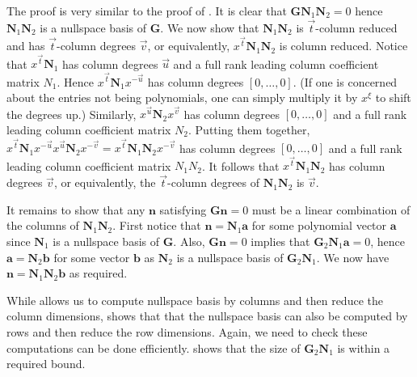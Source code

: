\begin{pf}
The proof is very similar to the proof of .
It is clear that $\mathbf{G}\mathbf{N}_{1}\mathbf{N}_{2}=0$ hence
$\mathbf{N}_{1}\mathbf{N}_{2}$ is a nullspace basis of $\mathbf{G}$.
We now show that $\mathbf{N}_{1}\mathbf{N}_{2}$ is $\vec{t}$-column
reduced and has $\vec{t}$-column degrees $\vec{v}$, or equivalently,
$x^{\vec{t}}\mathbf{N}_{1}\mathbf{N}_{2}$ is column reduced. Notice
that $x^{\vec{t}}\mathbf{N}_{1}$ has column degrees $\vec{u}$ and
a full rank leading column coefficient matrix $N_{1}$. Hence $x^{\vec{t}}\mathbf{N}_{1}x^{-\vec{u}}$
has column degrees $\left[0,\dots,0\right]$. (If one is concerned
about the entries not being polynomials, one can simply multiply it
by $x^{\xi}$ to shift the degrees up.) Similarly, $x^{\vec{u}}\mathbf{N}_{2}x^{\vec{v}}$
has column degrees $\left[0,\dots,0\right]$ and a full rank leading
column coefficient matrix $N_{2}$. Putting them together, $x^{\vec{t}}\mathbf{N}_{1}x^{-\vec{u}}x^{\vec{u}}\mathbf{N}_{2}x^{-\vec{v}}=x^{\vec{t}}\mathbf{N}_{1}\mathbf{N}_{2}x^{-\vec{v}}$
has column degrees $[0,\dots,0]$ and a full rank leading column coefficient
matrix $N_{1}N_{2}$. It follows that $x^{\vec{t}}\mathbf{N}_{1}\mathbf{N}_{2}$
has column degrees $\vec{v}$, or equivalently, the $\vec{t}$-column
degrees of $\mathbf{N}_{1}\mathbf{N}_{2}$ is $\vec{v}$.

It remains to show that any $\mathbf{n}$ satisfying $\mathbf{G}\mathbf{n}=0$
must be a linear combination of the columns of $\mathbf{N}_{1}\mathbf{N}_{2}$.
First notice that $\mathbf{n}=\mathbf{N}_{1}\mathbf{a}$ for some
polynomial vector $\mathbf{a}$ since $\mathbf{N}_{1}$ is a nullspace
basis of $\mathbf{G}$. Also, $\mathbf{G}\mathbf{n}=0$ implies that
$\mathbf{G}_{2}\mathbf{N}_{1}\mathbf{a}=0$, hence $\mathbf{a}=\mathbf{N}_{2}\mathbf{b}$
for some vector $\mathbf{b}$ as $\mathbf{N}_{2}$ is a nullspace
basis of $\mathbf{G}_{2}\mathbf{N}_{1}$. We now have $\mathbf{n}=\mathbf{N}_{1}\mathbf{N}_{2}\mathbf{b}$
as required.
\end{pf}
While  allows
us to compute nullspace basis by columns and then reduce the column
dimensions, 
shows that that the nullspace basis can also be computed by rows and
then reduce the row dimensions. Again, we need to check these computations
can be done efficiently.  shows that the
size of $\mathbf{G}_{2}\mathbf{N}_{1}$ is within a required bound.
